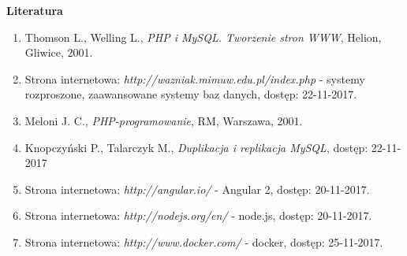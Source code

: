 \pagestyle {empty}

\vspace*{1.3cm}

{\Huge\textbf{Literatura}}

\vspace*{1cm}

\begin{enumerate}[\lbrack 1\rbrack]
	\item Thomson L., Welling L., \textit{PHP i MySQL. Tworzenie stron WWW}, Helion, Gliwice, 2001.
	\item Strona internetowa: \textit{http://wazniak.mimuw.edu.pl/index.php} - systemy rozproszone, zaawansowane
	systemy baz danych, dostęp: 22-11-2017. 
	\item Meloni J. C., \textit{PHP-programowanie}, RM, Warszawa, 2001.
	\item Knopczyński P., Talarczyk M., \textit{Duplikacja i replikacja MySQL}, dostęp: 22-11-2017
	\item Strona internetowa: \textit{http://angular.io/} - Angular 2, dostęp: 20-11-2017.
	\item Strona internetowa: \textit{http://nodejs.org/en/} - node.js, dostęp: 20-11-2017.
	\item Strona internetowa: \textit{http://www.docker.com/} - docker, dostęp: 25-11-2017.
\end{enumerate}

